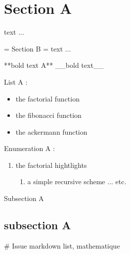 \section{Section A}
text ...

= Section B =
text ...


**bold text A**
__bold text__


List A :
\begin{itemize}
\item the factorial function
\item the fibonacci function
\item the ackermann function
\end{itemize}

Enumeration A :
\begin{enumerate}
\item the factorial hightlights
\begin{enumerate}
\item a simple recursive scheme
... etc.
\end{enumerate}
\end{enumerate}

Subsection A
\subsection{subsection A}



# Issue markdown list, mathematique



